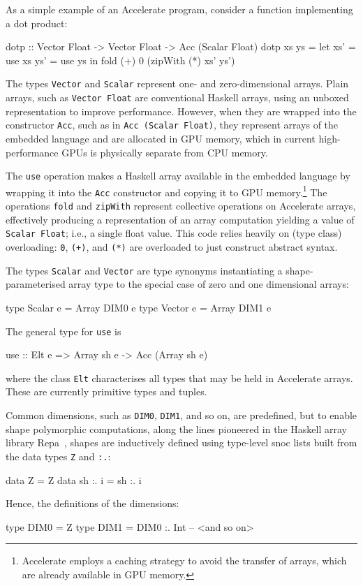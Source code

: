 \documentclass{llncs}
\begin{document}
As a simple example of an Accelerate program, consider a function implementing a dot product:
%
\begin{hcode}
dotp :: Vector Float -> Vector Float -> Acc (Scalar Float)
dotp xs ys = let xs' = use xs
                 ys' = use ys
             in  fold (+) 0 (zipWith (*) xs' ys')
\end{hcode}
%
The types \verb+Vector+ and \verb+Scalar+ represent one- and zero-dimensional
arrays. Plain arrays, such as \verb+Vector Float+ are conventional Haskell arrays, using an unboxed representation to improve performance. However, when they are wrapped into the constructor \verb+Acc+, such as in \verb+Acc (Scalar Float)+, they represent arrays of the embedded language and are allocated in GPU memory, which in current high-performance GPUs is physically separate from CPU memory.

The \verb+use+ operation makes a Haskell array available in the embedded language by wrapping it into the \verb+Acc+ constructor and copying it to GPU memory.\footnote{Accelerate employs a caching strategy to avoid the transfer of arrays, which are already available in GPU memory.} The operations \texttt{fold} and \texttt{zipWith} represent collective operations on Accelerate arrays, effectively producing a representation of an array computation yielding a value of
\texttt{Scalar Float}; i.e., a single float value. This code relies
heavily on (type class) overloading: \texttt{0}, \texttt{(+)}, and
\texttt{(*)} are overloaded to just construct abstract syntax. 

The types \verb+Scalar+ and \verb+Vector+ are type synonyms instantiating a shape-parameterised array type to the special case of zero and one dimensional arrays:
%
\begin{hcode}
type Scalar e = Array DIM0 e
type Vector e = Array DIM1 e
\end{hcode}

The general type for \verb+use+ is
%
\begin{hcode}
use :: Elt e => Array sh e -> Acc (Array sh e)
\end{hcode}
%
where the class \verb+Elt+ characterises all types that may be held in Accelerate arrays. These are currently primitive types and tuples.

Common dimensions, such as \verb+DIM0+, \verb+DIM1+, and so on, are
predefined, but to enable shape polymorphic computations, along the
lines pioneered in the Haskell array library
Repa~\cite{keller-etal:repa}, shapes are inductively defined using
type-level snoc lists built from the data types \texttt{Z} and \texttt{:.}:
%
\begin{hcode}
data Z       = Z
data sh :. i = sh :. i
\end{hcode}
%
Hence, the definitions of the dimensions:
%
\begin{hcode}
type DIM0 = Z
type DIM1 = DIM0 :. Int
-- <and so on>
\end{hcode}
\end{document}
